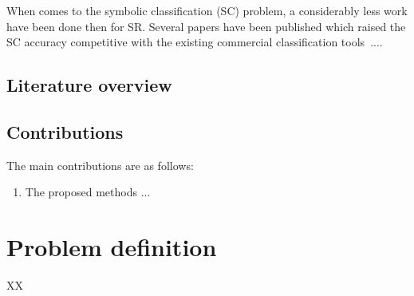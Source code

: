 \documentclass{bmcart}
\begin{document}
When comes to the symbolic classification (SC) problem, a considerably less work have been done then for SR. Several papers have been published which raised the SC accuracy competitive with the existing commercial classification tools~\cite{}.... 


 

\subsection{Literature overview}\label{sec:liteature}
 

\subsection{Contributions}\label{sec:contibutions}

The main contributions are as follows: 

\begin{enumerate}
	\item The proposed methods ...
\end{enumerate}
 
\section{Problem definition} \label{sec:search-space}
XX
\end{document}
